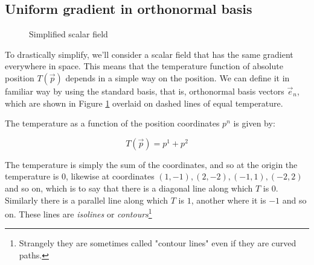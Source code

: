 \subsection{Uniform gradient in orthonormal basis}

\begin{figure}[h]
    \caption{Simplified scalar field}
    \centering
    \label{fig:scalar-field-std-basis}
\end{figure}

To drastically simplify, we'll consider a scalar field that has the same gradient everywhere in space. This means that the temperature function of absolute position $T(\vec{p})$ depends in a simple way on the position. We can define it in familiar way by using the standard basis, that is, orthonormal basis vectors $\vec{e}_n$, which are shown in Figure \ref{fig:scalar-field-std-basis} overlaid on dashed lines of equal temperature.

The temperature as a function of the position coordinates $p^n$ is given by:

\begin{equation}
    T(\vec{p}) = p^1 + p^2
    \label{eqn:t-absolute}
\end{equation}

The temperature is simply the sum of the coordinates, and so at the origin the temperature is $0$, likewise at coordinates $(1, -1), (2, -2), (-1, 1), (-2, 2)$ and so on, which is to say that there is a diagonal line along which $T$ is $0$. Similarly there is a parallel line along which $T$ is $1$, another where it is $-1$ and so on. These lines are \textit{isolines} or \textit{contours}\footnote{Strangely they are sometimes called "contour lines" even if they are curved paths.}

